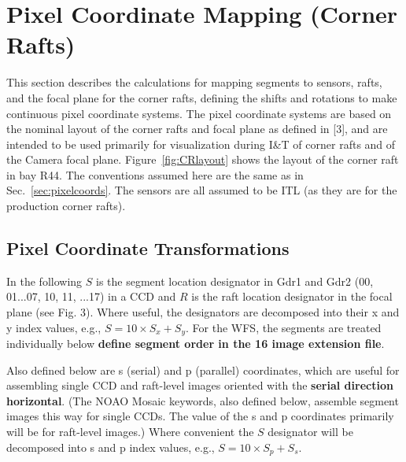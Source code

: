 \documentclass{article}[12pt]
\begin{document}
{%
%    

\section{Pixel Coordinate Mapping (Corner Rafts)\label{sec:crpixelcoords}}
This section describes the calculations for mapping segments to sensors, rafts, and the focal plane for the corner rafts, defining the shifts and rotations to make continuous pixel coordinate systems.  The pixel coordinate systems are based on the nominal layout of the corner rafts and focal plane as defined in [3], and are intended to be used primarily for visualization during I\&T of corner rafts and of the Camera focal plane.  Figure~\ref{fig:CRlayout} shows the layout of the corner raft in bay R44.  The conventions assumed here are the same as in Sec.~\ref{sec:pixelcoords}.  The sensors are all assumed to be ITL (as they are for the production corner rafts).

\subsection{Pixel Coordinate Transformations}
In the following $S$ is the segment location designator in Gdr1 and Gdr2 (00, 01...07, 10, 11, ...17) in a CCD and $R$ is the raft location designator in the focal plane (see Fig. 3).  Where useful, the designators are decomposed into their x and y index values, e.g., $S = 10 \times S_x + S_y$.  For the WFS, the segments are treated individually below {\bf define segment order in the 16 image extension file}.

Also defined below are s (serial) and p (parallel) coordinates, which are useful for assembling single CCD and raft-level images oriented with the {\bf serial direction horizontal}.  (The NOAO Mosaic keywords, also defined below, assemble segment images this way for single CCDs.  The value of the s and p coordinates primarily will be for raft-level images.)  Where convenient the $S$ designator will be decomposed into s and p index values, e.g., $S = 10 \times S_p + S_s$.

}
\end{document}
